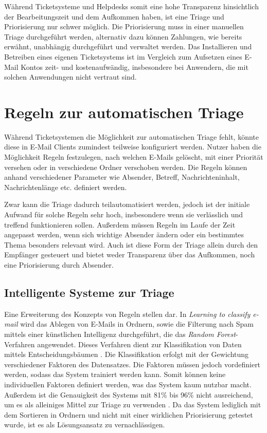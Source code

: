 Während Ticketsysteme und Helpdesks somit eine hohe Transparenz hinsichtlich der Bearbeitungszeit und dem Aufkommen haben, ist eine Triage und Priorisierung nur schwer möglich. Die Priorisierung muss in einer manuellen Triage durchgeführt werden, alternativ dazu können Zahlungen, wie bereits erwähnt, unabhängig durchgeführt und verwaltet werden. Das Installieren und Betreiben eines eigenen Ticketsystems ist im Vergleich zum Aufsetzen eines E-Mail Kontos zeit- und kostenaufwändig, insbesondere bei Anwendern, die mit solchen Anwendungen nicht vertraut sind.


\section{Regeln zur automatischen Triage}
Während Ticketsystemen die Möglichkeit zur automatischen Triage fehlt, könnte diese in E-Mail Clients zumindest teilweise konfiguriert werden. Nutzer haben die Möglichkeit Regeln festzulegen, nach welchen E-Mails gelöscht, mit einer Priorität versehen oder in verschiedene Ordner verschoben werden. Die Regeln können anhand verschiedener Parameter wie Absender, Betreff, Nachrichteninhalt, Nachrichtenlänge etc. definiert werden.

Zwar kann die Triage dadurch teilautomatisiert werden, jedoch ist der initiale Aufwand für solche Regeln sehr hoch, insbesondere wenn sie verlässlich und treffend funktionieren sollen. Außerdem müssen Regeln im Laufe der Zeit angepasst werden, wenn sich wichtige Absender ändern oder ein bestimmtes Thema besonders relevant wird. Auch ist diese Form der Triage allein durch den Empfänger gesteuert und bietet weder Transparenz über das Aufkommen, noch eine Priorisierung durch Absender.

\subsection{Intelligente Systeme zur Triage}

Eine Erweiterung des Konzepts von Regeln stellen \cite{Koprinska2007} dar. In \textit{Learning to classify e-mail} wird das Ablegen von E-Mails in Ordnern, sowie die Filterung nach Spam mittels einer künstlichen Intelligenz durchgeführt, die das \textit{Random Forest}-Verfahren angewendet. Dieses Verfahren dient zur Klassifikation von Daten mittels Entscheidungsbäumen \citep[S. 5 f.]{Breiman2001}. Die Klassifikation erfolgt mit der Gewichtung verschiedener Faktoren des Datensatzes. Die Faktoren müssen jedoch vordefiniert werden, sodass das System trainiert werden kann. Somit können keine individuellen Faktoren definiert werden, was das System kaum nutzbar macht. Außerdem ist die Genauigkeit des Systems mit 81\% bis 96\% nicht ausreichend, um es als alleiniges Mittel zur Triage zu verwenden \citep[S. 2174]{Koprinska2007}. Da das System lediglich mit dem Sortieren in Ordnern und nicht mit einer wirklichen Priorisierung getestet wurde, ist es als Lösungsansatz zu vernachlässigen.

